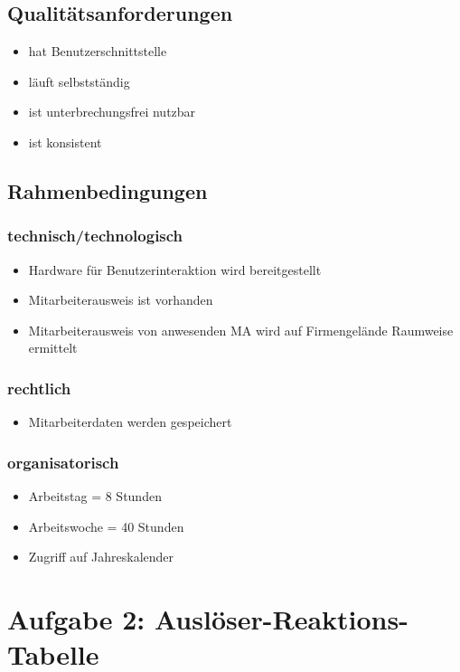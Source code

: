 \section{Qualitätsanforderungen}

\begin{itemize}
\item hat Benutzerschnittstelle
\item läuft selbstständig
\item ist unterbrechungsfrei nutzbar %
\item ist konsistent
\end{itemize}

\section{Rahmenbedingungen}
\subsection{technisch/technologisch}
\begin{itemize}
\item Hardware für Benutzerinteraktion wird bereitgestellt
\item Mitarbeiterausweis ist vorhanden
\item Mitarbeiterausweis von anwesenden MA wird auf Firmengelände Raumweise ermittelt
\end{itemize}
\subsection{rechtlich}
\begin{itemize}
\item Mitarbeiterdaten werden gespeichert
\end{itemize}
\subsection{organisatorisch}
\begin{itemize}
\item Arbeitstag = 8 Stunden
\item Arbeitswoche = 40 Stunden
\item Zugriff auf Jahreskalender
\end{itemize}

\chapter*{Aufgabe 2: Auslöser-Reaktions-Tabelle}
\setcounter{section}{0}
\addtocounter{chapter}{1}

